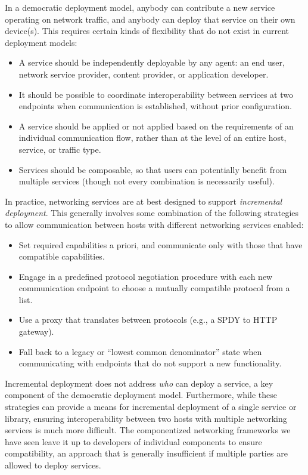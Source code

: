 In a democratic deployment model, anybody can contribute a 
new service operating on network traffic, and anybody can 
deploy that service on their own device(s).
This requires certain kinds of flexibility that do not 
exist in current deployment models:
\begin{itemize}
  \item A service should be independently deployable by any agent: 
  an end user, network service provider, content provider, 
  or application developer.
  \item It should be possible to coordinate interoperability 
  between services at two endpoints
  when communication is established, 
  without prior configuration.
  \item A service should be applied or not applied based on the 
  requirements of an individual communication flow, rather than
  at the level of an entire host, service, or traffic type.
  \item Services should be composable, so that users can 
  potentially benefit 
  from multiple services (though not 
  every combination is necessarily useful).
\end{itemize}



In practice, networking services are at best designed 
to support \textit{incremental deployment}. This generally involves 
some combination of the following strategies 
to allow communication between hosts 
with different networking services enabled: 
\begin{itemize}
\item Set required capabilities a priori, and communicate
only with those that have compatible capabilities.
\item Engage in a predefined protocol negotiation 
procedure with each new communication endpoint
to choose a mutually compatible protocol from a list.
\item Use a proxy that translates between  
protocols (e.g., a SPDY to HTTP gateway).
\item Fall back to a legacy or ``lowest common denominator'' state
when communicating with endpoints that do not support 
a new functionality.
\end{itemize}

Incremental deployment does not address \textit{who}
can deploy a service, a key component of the
democratic deployment model.
Furthermore, while these strategies can provide a means 
for incremental deployment of a single service or library, 
ensuring interoperability between two hosts with
multiple networking services 
is much more difficult. 
The componentized 
networking frameworks we have seen 
leave it up to developers of individual components
to ensure compatibility, 
an approach that is generally insufficient if multiple parties
are allowed to deploy services.

